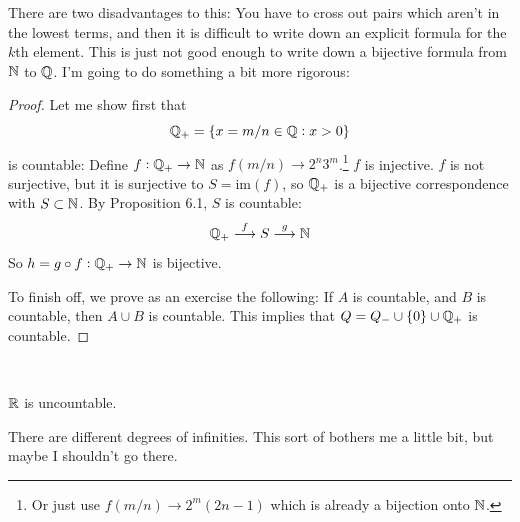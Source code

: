 \documentclass[10pt]{scrartcl}
\begin{document}
 There are two disadvantages to this: You have to cross out pairs which aren't in the lowest terms, and then it is difficult to write down an explicit formula for the $k$th element. This is just not good enough to write down a bijective formula from $\mathbb{N}$ to $\mathbb{Q}$. I'm going to do something a bit more rigorous: 
 


\begin{proof}
Let me show first that 
\[\mathbb{Q}_{+} = \{ x = m/n \in \mathbb{Q}: x > 0\}\]	
is countable: Define $f: \mathbb{Q}_+ \to \mathbb{N}$ as $f(m/n) \to 2^n3^m$.\footnote{Or just use $f(m/n) \to 2^{m}(2n-1)$ which is already a bijection onto $\mathbb{N}$.} $f$ is injective. $f$ is not surjective, but it is surjective to $S = \mathrm{im}(f)$, so $\mathbb{Q}_+$ is a bijective correspondence with $S \subset \mathbb{N}$. By Proposition 6.1, $S$ is countable: 
\[\mathbb{Q}_+ \overset{f}{\longrightarrow} S \overset{g}{\longrightarrow} \mathbb{N}\]
So $h = g \circ f: \mathbb{Q}_+ \to \mathbb{N}$ is bijective. 

To finish off, we prove as an exercise the following: If $A$ is countable, and $B$ is countable, then $A \cup B$ is countable. This implies that $Q = Q_- \cup \{0\} \cup \mathbb{Q}_+$ is countable.
\end{proof}

\

\begin{theorem}
$\mathbb{R}$ is uncountable.
\end{theorem}

There are different degrees of infinities. This sort of bothers me a little bit, but maybe I shouldn't go there. 
\end{document}
